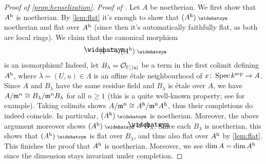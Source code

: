 \documentclass[a4paper, 10pt, oneside, DIV=9, chapterprefix=true, numbers=enddot, bibliography=totoc]{scrbook}
\begin{document}
\begin{proof}[Proof of \cref{prop:henselization}]
	\emph{Proof of .} Let $A$ be noetherian. We first show that $A^{\mathrm{h}}$ is noetherian. By \cref{lem:flat} it's enough to show that $(A^\h)^\complete$ noetherian and flat over $A^{\mathrm{h}}$ (since then it's automatically faithfully flat, as both are local rings). We claim that the canonical morphism
	\begin{equation}\label{eq:AhComplete}
		\roof{A}\isomorphism(A^\h)^\complete
	\end{equation}
	is an isomorphism! Indeed, let $B_\lambda=\mathcal{O}_{U,|u|}$ be a term in the first colimit defining $A^{\mathrm{h}}$, where $\lambda=(U,u)\in\Lambda$ is an affine étale neighbourhood of $x\colon \Spec k^\sep\morphism A$. Since $A$ and $B_\lambda$ have the same residue field and $B_\lambda$ is étale over $A$, we have $A/\mathfrak{m}^n\cong B_\lambda/\mathfrak{m}^nB_\lambda$ for all $n\geq 1$ (this is a quite well-known property; see \cite[Lemma~A.4.2]{jacobians} for example). Taking colimits shows $A/\mathfrak{m}^n\cong A^{\mathrm{h}}/\mathfrak{m}^nA^{\mathrm{h}}$, thus their completions do indeed coincide. In particular, $(A^\h)^\complete$ is noetherian. Moreover, the above argument moreover shows $(A^\h)^\complete\cong \roof{B}_\lambda$. Since each $B_\lambda$ is noetherian, this shows that $(A^\h)^\complete$ is flat over $B_\lambda$, and thus also flat over $A^{\mathrm{h}}$ by \cref{lem:flat}. This finishes the proof that $A^{\mathrm{h}}$ is noetherian. Moreover, we see $\dim A=\dim A^{\mathrm{h}}$ since the dimension stays invariant under completion.
	

\end{proof}
\end{document}
